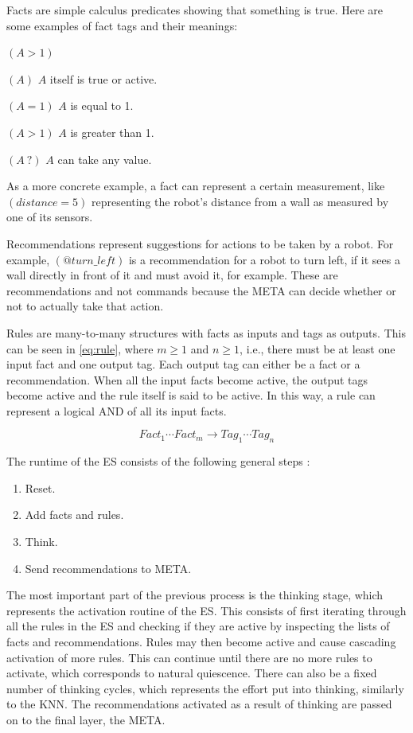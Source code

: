 \documentclass[titlepage,11pt]{article}
\begin{document}
Facts are simple calculus predicates showing that something is true. Here are some examples of fact tags and their meanings:

\begin{labeling}{$(A > 1)$}
	\item[$(A)$] $A$ itself is true or active.
	\item[$(A = 1)$] $A$ is equal to 1.
	\item[$(A > 1)$] $A$ is greater than 1.
	\item[$(A \ ?)$] $A$ can take any value.
\end{labeling}

As a more concrete example, a fact can represent a certain measurement, like $(distance = 5)$ representing the robot's distance from a wall as measured by one of its sensors.

Recommendations represent suggestions for actions to be taken by a robot. For example, $(@turn\_left)$ is a recommendation for a robot to turn left, if it sees a wall directly in front of it and must avoid it, for example. These are recommendations and not commands because the META can decide whether or not to actually take that action.

Rules are many-to-many structures with facts as inputs and tags as outputs. This can be seen in \autoref{eq:rule}, where $m \geq 1$ and $n \geq 1$, i.e., there must be at least one input fact and one output tag. Each output tag can either be a fact or a recommendation. When all the input facts become active, the output tags become active and the rule itself is said to be active. In this way, a rule can represent a logical AND of all its input facts.

\begin{equation} \label{eq:rule}
Fact_1 \cdots Fact_m \rightarrow Tag_1 \cdots Tag_n
\end{equation}

The runtime of the ES consists of the following general steps \cite{vybihal-expert}:

\begin{enumerate}
	\item Reset.
	\item Add facts and rules.
	\item Think.
	\item Send recommendations to META.
\end{enumerate}

The most important part of the previous process is the thinking stage, which represents the activation routine of the ES. This consists of first iterating through all the rules in the ES and checking if they are active by inspecting the lists of facts and recommendations. Rules may then become active and cause cascading activation of more rules. This can continue until there are no more rules to activate, which corresponds to natural quiescence. There can also be a fixed number of thinking cycles, which represents the effort put into thinking, similarly to the KNN. The recommendations activated as a result of thinking are passed on to the final layer, the META.
\end{document}
